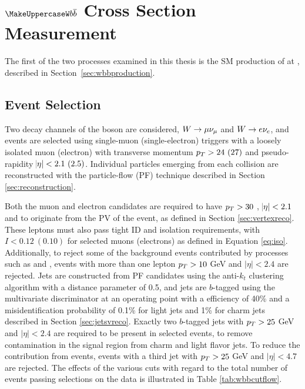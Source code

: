 
\chapter[$\boldsymbol{Wb\overline{b}}$ Cross Section Measurement]{${\expandafter\MakeUppercase W}b\overline{b}$ Cross Section Measurement}\label{sec:wbbxc}

The first of the two processes examined 
 in this thesis is the SM production
 of \ppwbblnbb at  \TeV, described
 in Section~\ref{sec:wbbproduction}.

\section{Event Selection}

Two decay channels of the \w boson are considered,
 $W\rightarrow \mu\nu_\mu$ and $W\rightarrow e\nu_e$,
 and events are selected using
 single-muon (single-electron) triggers with a
 loosely isolated muon (electron)
 with transverse momentum $p_T>24~(27)$ \GeV
 and pseudo-rapidity $\abs{\eta}<2.1~(2.5)$.
Individual particles emerging from each
 collision are reconstructed with the
 particle-flow (PF) technique described
 in Section \ref{sec:reconstruction}.

Both the muon and electron candidates are required to have 
 $p_T > 30$ \GeV, $\abs{\eta}<2.1$ and
 to originate from the PV of the event,
 as defined in Section \ref{sec:vertexreco}.
These leptons must also pass
 tight ID and isolation requirements,
 with $I < 0.12~(0.10)$ for selected muons
 (electrons) as defined in Equation \ref{eq:iso}.
Additionally, to reject some of the background events
 contributed by processes such as \ppttbar
 and \ppzj, events with more than one 
 lepton {$p_T > 10$} GeV and {$|\eta| < 2.4$}
 are rejected.
Jets are constructed from PF candidates using the
 anti-$k_t$ clustering algorithm \cite{Cacciari:2008gp}
 with a distance parameter of 0.5,
 and jets are $b$-tagged using the multivariate
 discriminator at an operating point
 with a efficiency of 40\% and a misidentification probability of
 0.1\% for light jets and 1\% for charm jets
 described in Section \ref{sec:jetsvreco}.
Exactly two $b$-tagged jets with
 {$p_T > 25$} GeV and {$|\eta| < 2.4$} are required
 to be present in selected events, to 
 remove contamination in the signal region from 
 charm and light flavor jets.
To reduce the contribution from \ppttbar events,
 events  with
 a third jet with {$p_T > 25$} GeV and {$|\eta| < 4.7$}
 are rejected.
The effects of the various cuts with regard to the 
 total number of events passing selections on the data 
 is illustrated in Table \ref{tab:wbbcutflow}.

